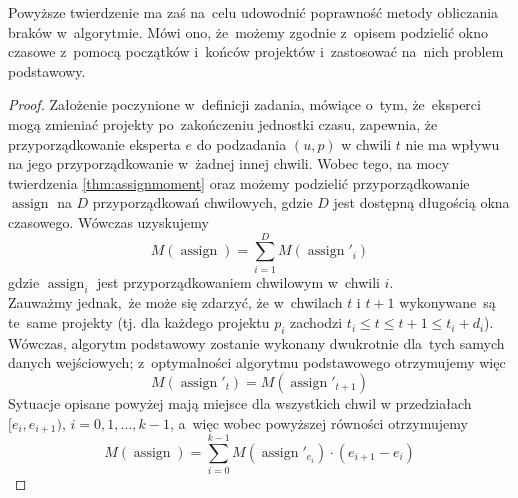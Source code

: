 \documentclass[12pt,a4paper]{article}
\theoremstyle{definition}
\DeclareMathOperator{\assign}{assign}
\begin{document}
\noindent
Powyższe twierdzenie ma zaś na~celu udowodnić poprawność metody obliczania braków w~algorytmie.
Mówi ono, że~możemy zgodnie z~opisem podzielić okno czasowe z~pomocą początków i~końców projektów i~zastosować na~nich problem podstawowy.

\begin{proof}
Założenie poczynione w~definicji zadania, mówiące o~tym, że~eksperci mogą zmieniać projekty po~zakończeniu jednostki czasu, zapewnia, że przyporządkowanie eksperta $e$ do podzadania $(u, p)$ w chwili $t$ nie ma wpływu na jego przyporządkowanie w~żadnej innej chwili.
Wobec tego, na mocy twierdzenia \ref{thm:assignmoment} oraz możemy podzielić przyporządkowanie $\assign$ na $D$ przyporządkowań chwilowych, gdzie $D$ jest dostępną długością okna czasowego.
Wówczas uzyskujemy
$$ M(\assign) = \sum_{i=1}^{D} M(\assign'_i) $$
gdzie $\assign_i$ jest przyporządkowaniem chwilowym w~chwili $i$.\\

\noindent
Zauważmy jednak,~że może się zdarzyć, że w~chwilach $t$ i $t+1$ wykonywane~są te~same projekty (tj. dla każdego projektu $p_i$ zachodzi $t_i \leq t \leq t+1 \leq t_i + d_i$).
Wówczas, algorytm podstawowy zostanie wykonany dwukrotnie dla~tych samych danych wejściowych; z~optymalności algorytmu podstawowego otrzymujemy więc
$$ M(\assign'_t) = M(\assign'_{t+1}) $$
Sytuacje opisane powyżej mają miejsce dla wszystkich chwil w przedziałach $[e_i, e_{i+1})$, $i = 0, 1, \dots, k-1$,
a~więc wobec powyższej równości otrzymujemy
$$ M(\assign) = \sum_{i=0}^{k-1} M(\assign'_{e_i}) \cdot (e_{i+1} - e_i) $$
\end{proof}
\end{document}
